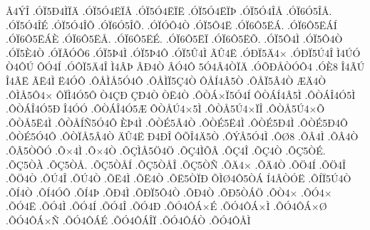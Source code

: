 {^^c24^^dd^^ce
.^^d3^^cf5^^d04^^cc^^cf^^c4
.^^d3^^cf5^^d34^^cb^^cf^^c2
.^^d3^^cf5^^d34^^cb^^cf^^cb
.^^d3^^cf5^^d34^^cb^^cf^^de
.^^d3^^cf5^^d34^^ce^^c5
.^^d3^^cf6^^d35^^ce^^c5.
.^^d3^^cf5^^d34^^ce^^c9
.^^d3^^cf5^^d34^^ce^^d5
.^^d3^^cf6^^d35^^ce^^d5.
.^^d3^^cf^^d3^^d44^^d2
.^^d3^^cf5^^d44^^cb
.^^d3^^cf6^^d45^^cb^^c1.
.^^d3^^cf6^^d45^^cb^^c1^^cd
.^^d3^^cf6^^d45^^cb^^c1^^c8
.^^d3^^cf6^^d45^^cb^^c5.
.^^d3^^cf6^^d45^^cb^^c9.
.^^d3^^cf6^^d45^^cb^^cf
.^^d3^^cf6^^d45^^cb^^d5.
.^^d3^^cf5^^d44^^cc
.^^d3^^cf5^^d44^^d2
.^^d3^^cf5^^c84^^d2
.^^d3^^cf^^c3^^d3^^d46
.^^d3^^cf5^^de4^^cc
.^^d3^^cf5^^de4^^d4
.^^d3^^cf5^^db4^^cc
^^c3^^db4^^cb
.^^d3^^d0^^cf5^^c44^^d7
.^^d3^^d0^^cf5^^da4^^ce
^^cc4^^da^^d3
^^d24^^d4^^da
^^d4^^d34^^cd
.^^d3^^d4^^cf5^^c44^^ce
^^cc4^^c2^^de
^^c2^^d04^^d2
^^c2^^d34^^d4
5^^d34^^c24^^d2^^cf^^c4
.^^d3^^d5^^d0^^c5^^d2^^d3^^d44
.^^d3^^c88
^^ce4^^c3^^da
^^ce4^^c3^^cb
^^c3^^cb4^^cc
^^cb4^^d3^^d4
.^^d4^^c5^^cc^^c55^^d34^^d4
.^^d4^^c5^^cc^^cf5^^c74^^d2
^^d4^^c5^^cd4^^c25^^d2
.^^d4^^c5^^cf5^^c24^^d2
^^c6^^c44^^d2
.^^d4^^cc^^c55^^d44^^d7
^^d4^^cf^^cc4^^d35^^d4
^^d24^^c7^^d0
^^c7^^d04^^d2
^^d2^^cb4^^d2
.^^d4^^d2^^c1^^d7^^cf5^^d34^^cd
^^d4^^d2^^c1^^cd4^^c25^^cc
.^^d4^^d2^^c1^^ce4^^d35^^cc
.^^d4^^d2^^c1^^ce4^^d35^^d0
^^ce4^^d3^^d3
.^^d4^^d2^^c1^^ce4^^d35^^c6
^^d4^^d2^^c5^^da4^^d75^^cc
.^^d4^^d2^^c55^^da4^^d7^^cf^^ce
.^^d4^^d2^^c55^^da4^^d7^^d5
.^^d4^^d2^^c55^^cb4^^cc
.^^d4^^d2^^c5^^cd^^d15^^d34^^d4
^^c8^^de4^^cc
.^^d4^^d2^^c95^^c24^^d2
.^^d4^^d2^^c95^^cb4^^cc
.^^d4^^d2^^c95^^d04^^cc
.^^d4^^d2^^c95^^d04^^d4
.^^d4^^d2^^c95^^d34^^d4
.^^d4^^d2^^cf^^c55^^c24^^d2
^^c4^^db4^^cb
^^d04^^d0^^ce
^^d4^^d5^^ce4^^c45^^d2
.^^d4^^dd^^c55^^d34^^cc
.^^d4^^d88
.^^d5^^c24^^cc
.^^d5^^c24^^d2
.^^d5^^c25^^d2^^d5^^d3
.^^d5^^d74^^cc
.^^d5^^d74^^d2
.^^d5^^c7^^cc^^c55^^d64^^d6
.^^d5^^c74^^cc^^d5^^c2
.^^d5^^c74^^ce
.^^d5^^c74^^d2
.^^d5^^c75^^d2^^c9.
.^^d5^^c75^^d2^^c0
.^^d5^^c75^^d2^^c5.
.^^d5^^c75^^d2^^c5^^cd
.^^d5^^c75^^d2^^c5^^ce
.^^d5^^c75^^d2^^d1
.^^d5^^c44^^d7
.^^d5^^c44^^d2
.^^d5^^d64^^cd
.^^d5^^d64^^ce
.^^d5^^d64^^d2
.^^d5^^da4^^ce
.^^d5^^da4^^d2
.^^d5^^cb4^^cc
.^^d5^^cb4^^d2
.^^d5^^cb5^^d2^^cf^^d0
^^d5^^cc^^d84^^d45^^d2^^c1
^^cd4^^c2^^d2^^d3^^cb
.^^d5^^cd^^cf5^^da4^^d2
.^^d5^^cd4^^d2
.^^d5^^cd4^^d3^^d4
.^^d5^^cd4^^de
.^^d5^^d04^^cc
.^^d5^^d0^^cf5^^d44^^d2
.^^d5^^d04^^d2
.^^d5^^d05^^d2^^c1^^d6
.^^d5^^d24^^d7
.^^d5^^d34^^d7
.^^d5^^d34^^cb
.^^d5^^d34^^cc
.^^d5^^d34^^cd
.^^d5^^d34^^ce
.^^d5^^d34^^d0
.^^d5^^d34^^d4^^c1^^d7^^c9
.^^d5^^d34^^d4^^c1^^d7^^cc
.^^d5^^d34^^d4^^c1^^d7^^d8
.^^d5^^d34^^d4^^c1^^d7^^d1
.^^d5^^d34^^d4^^c1^^c9
.^^d5^^d34^^d4^^c1^^ce^^cf
.^^d5^^d34^^d4^^c1^^d2
.^^d5^^d34^^d4^^c5^^cc
}
